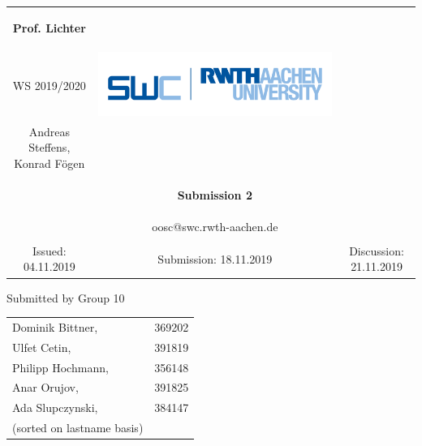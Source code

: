 \documentclass[a4paper,12pt,oneside]{scrreprt}
\begin{document}
	
	\begin{tabular}{ccc}
		\begin{large} \textbf{Prof. Lichter} \end{large} &
		
		\begin{minipage}[H]{3.5cm}
			\centering
			\begin{large} OOSC \end{large} \\
			\begin{large} WS 2019/2020 \end{large}
		\end{minipage} &
		
		\begin{minipage}[H]{4cm}
			\includegraphics[keepaspectratio,width=\textwidth,angle=0]{images/swc.png}
		\end{minipage} \\
		Andreas Steffens, Konrad F\"ogen &  &  \\
		& \begin{huge} \textbf{Submission 2} \end{huge}&  \\
		& oosc@swc.rwth-aachen.de &  \\
		& & \\
		Issued: 04.11.2019 &
		Submission: 18.11.2019 &
		Discussion: 21.11.2019 \\
	\end{tabular}
	\newline \newline \newline
	\centering
	Submitted by Group 10
	
	\begin{tabular}{ll}
		Dominik Bittner, & 369202 \\
		Ulfet Cetin, & 391819\\
		Philipp Hochmann, & 356148 \\
		Anar Orujov, & 391825\\
		Ada Slupczynski, & 384147\\
		(sorted on lastname basis)
	\end{tabular}
    
\end{document}
